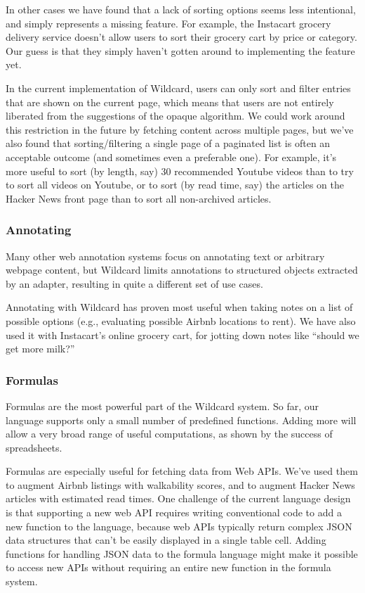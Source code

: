 \documentclass[sigplan,10pt,anonymous,review]{acmart}
\begin{document}
In other cases we have found that a lack of sorting options seems less
intentional, and simply represents a missing feature. For example, the
Instacart grocery delivery service doesn't allow users to sort their
grocery cart by price or category. Our guess is that they simply haven't
gotten around to implementing the feature yet.

In the current implementation of Wildcard, users can only sort and
filter entries that are shown on the current page, which means that
users are not entirely liberated from the suggestions of the opaque
algorithm. We could work around this restriction in the future by
fetching content across multiple pages, but we've also found that
sorting/filtering a single page of a paginated list is often an
acceptable outcome (and sometimes even a preferable one). For example,
it's more useful to sort (by length, say) 30 recommended Youtube videos
than to try to sort all videos on Youtube, or to sort (by read time,
say) the articles on the Hacker News front page than to sort all
non-archived articles.

\hypertarget{annotating}{%
\subsubsection{Annotating}\label{annotating}}

Many other web annotation systems focus on annotating text or arbitrary
webpage content, but Wildcard limits annotations to structured objects
extracted by an adapter, resulting in quite a different set of use
cases.

Annotating with Wildcard has proven most useful when taking notes on a
list of possible options (e.g., evaluating possible Airbnb locations to
rent). We have also used it with Instacart's online grocery cart, for
jotting down notes like ``should we get more milk?''

\hypertarget{formulas}{%
\subsubsection{Formulas}\label{formulas}}

Formulas are the most powerful part of the Wildcard system. So far, our
language supports only a small number of predefined functions. Adding
more will allow a very broad range of useful computations, as shown by
the success of spreadsheets.

Formulas are especially useful for fetching data from Web APIs. We've
used them to augment Airbnb listings with walkability scores, and to
augment Hacker News articles with estimated read times. One challenge of
the current language design is that supporting a new web API requires
writing conventional code to add a new function to the language, because
web APIs typically return complex JSON data structures that can't be
easily displayed in a single table cell. Adding functions for handling
JSON data to the formula language might make it possible to access new
APIs without requiring an entire new function in the formula system.
\end{document}
